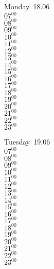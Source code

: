 \documentclass[11pt, a4paper]{book}\usepackage[]{graphicx}\usepackage[]{color}
\begin{document}
\begin{headerbox}
\end{headerbox}
\begin{weekdaybox}
  Monday~18.06\\
  { 
  \vfill
  $07^{00}$\\
$08^{00}$\\
$09^{00}$\\
$10^{00}$\\
$11^{00}$\\
$12^{00}$\\
$13^{00}$\\
$14^{00}$\\
$15^{00}$\\
$16^{00}$\\
$17^{00}$\\
$18^{00}$\\
$19^{00}$\\
$20^{00}$\\
$21^{00}$\\
$22^{00}$\\
$23^{00}$\\
  }
\end{weekdaybox}
\begin{weekdaybox}
  Tuesday~19.06\\
  { 
  \vfill
  $07^{00}$\\
$08^{00}$\\
$09^{00}$\\
$10^{00}$\\
$11^{00}$\\
$12^{00}$\\
$13^{00}$\\
$14^{00}$\\
$15^{00}$\\
$16^{00}$\\
$17^{00}$\\
$18^{00}$\\
$19^{00}$\\
$20^{00}$\\
$21^{00}$\\
$22^{00}$\\
$23^{00}$\\
  }
\end{weekdaybox}
\end{document}
